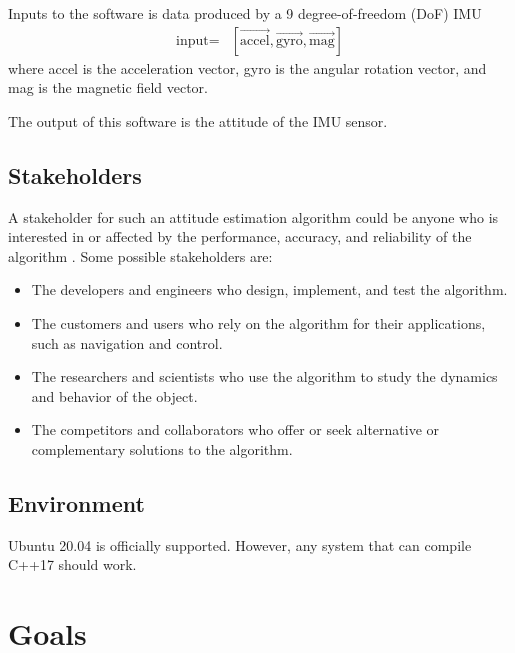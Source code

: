 \documentclass{article}
\begin{document}
Inputs to the software is data produced by a 9 degree-of-freedom (DoF) IMU
\begin{align*}
    \text{input} =& [\vec{\text{accel}}, \vec{\text{gyro}}, \vec{\text{mag}} ]
\end{align*}
where accel is the acceleration vector, gyro is the angular rotation vector, and mag is the magnetic field vector.

The output of this software is the attitude of the IMU sensor.



\subsection{Stakeholders}

A stakeholder for such an attitude estimation algorithm could be anyone who is interested in or affected by the performance, accuracy, and reliability of the algorithm \cite{stake}. Some possible stakeholders are:
\begin{itemize}
    \item The developers and engineers who design, implement, and test the algorithm.
    \item The customers and users who rely on the algorithm for their applications, such as navigation and control.
    \item The researchers and scientists who use the algorithm to study the dynamics and behavior of the object.
    \item The competitors and collaborators who offer or seek alternative or complementary solutions to the algorithm.
\end{itemize}
    

\subsection{Environment}

Ubuntu 20.04 is officially supported. However, any system that can compile C++17 should work.


\section{Goals}
\end{document}
